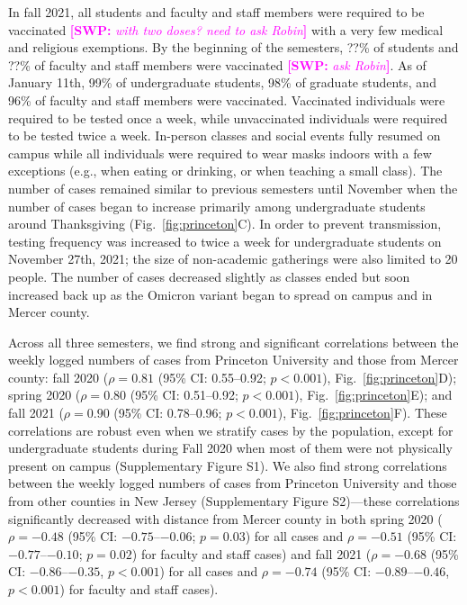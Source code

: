 \documentclass[12pt]{article}
\newcommand{\fref}[1]{Fig.~\ref{fig:#1}}
\newcommand{\comment}[3]{\textcolor{#1}{\textbf{[#2: }\textsl{#3}\textbf{]}}}
\newcommand{\swp}[1]{\comment{magenta}{SWP}{#1}}
\begin{document}
In fall 2021, all students and faculty and staff members were required to be vaccinated \swp{with two doses? need to ask Robin} with a very few medical and religious exemptions.
By the beginning of the semesters, ??\% of students and ??\% of faculty and staff members were vaccinated \swp{ask Robin}.
As of January 11th, 99\% of undergraduate students, 98\% of graduate students, and 96\% of faculty and staff members were vaccinated.
Vaccinated individuals were required to be tested once a week, while unvaccinated individuals were required to be tested twice a week.
In-person classes and social events fully resumed on campus while all individuals were required to wear masks indoors with a few exceptions (e.g., when eating or drinking, or when teaching a small class).
The number of cases remained similar to previous semesters until November when the number of cases began to increase primarily among undergraduate students around Thanksgiving (\fref{princeton}C).  
In order to prevent transmission, testing frequency was increased to twice a week for undergraduate students on November 27th, 2021; the size of non-academic gatherings were also limited to 20 people.
The number of cases decreased slightly as classes ended but soon increased back up as the Omicron variant began to spread on campus and in Mercer county.

Across all three semesters, we find strong and significant correlations between the weekly logged numbers of cases from Princeton University and those from Mercer county:
fall 2020 ($\rho = 0.81$ (95\% CI: 0.55--0.92; $p < 0.001$), \fref{princeton}D); spring 2020 ($\rho = 0.80$ (95\% CI: 0.51--0.92; $p < 0.001$), \fref{princeton}E); and fall 2021 ($\rho = 0.90$ (95\% CI: 0.78--0.96; $p < 0.001$), \fref{princeton}F). 
These correlations are robust even when we stratify cases by the population, except for undergraduate students during Fall 2020 when most of them were not physically present on campus (Supplementary Figure S1).
We also find strong correlations between the weekly logged numbers of cases from Princeton University and those from other counties in New Jersey (Supplementary Figure S2)---these correlations significantly decreased with distance from Mercer county in both spring 2020 ($\rho=-0.48$ (95\% CI: $-0.75$--$-0.06$; $p = 0.03$) for all cases and $\rho=-0.51$ (95\% CI: $-0.77$--$-0.10$; $p = 0.02$) for faculty and staff cases) and fall 2021 ($\rho=-0.68$ (95\% CI: $-0.86$--$-0.35$, $p < 0.001$) for all cases and $\rho=-0.74$ (95\% CI: $-0.89$--$-0.46$, $p < 0.001$) for faculty and staff cases).
\end{document}
